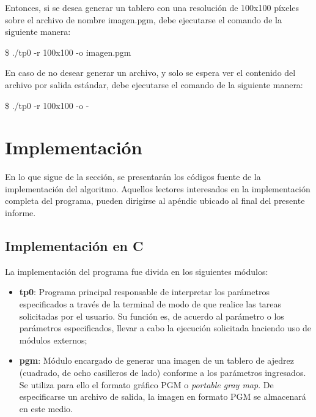 \documentclass{article}
\begin{document}
	Entonces, si se desea generar un tablero con una resolución de 100x100 píxeles sobre el archivo de nombre imagen.pgm, debe ejecutarse el comando de la siguiente manera:
	\bigskip

	{\ttfamily\footnotesize
	\$ ./tp0  -r 100x100 -o imagen.pgm\\}

	En caso de no desear generar un archivo, y solo se espera ver el contenido del archivo por salida estándar, debe ejecutarse el comando de la siguiente manera:
	\bigskip

	{\ttfamily\footnotesize
	\$ ./tp0  -r 100x100 -o -\\}
\medskip




\section{Implementación}
	
	En lo que sigue de la sección, se presentarán los códigos fuente de la implementación del algoritmo. Aquellos lectores interesados en la implementación completa del programa, pueden dirigirse al apéndic ubicado al final del presente informe.
\bigskip



\subsection{Implementación en C}

	La implementación del programa fue divida en los siguientes módulos:
	\medskip

\begin{itemize}

\itemsep=2pt \topsep=0pt \partopsep=0pt \parskip=2pt \parsep=0pt
	\item \textbf{tp0}: Programa principal responsable de interpretar los parámetros especificados a través de la terminal de modo de que realice las tareas solicitadas por el usuario. Su función es, de acuerdo al parámetro o los parámetros especificados, llevar a cabo la ejecución solicitada haciendo uso de módulos externos;
	\item \textbf{pgm}: Módulo encargado de generar una imagen de un tablero de ajedrez (cuadrado, de ocho casilleros de lado) conforme a los parámetros ingresados. Se utiliza para ello el formato gráfico PGM o \textit{portable gray map}. De especificarse un archivo de salida, la imagen en formato PGM se almacenará en este medio.

\end{itemize}	
\bigskip
\end{document}
